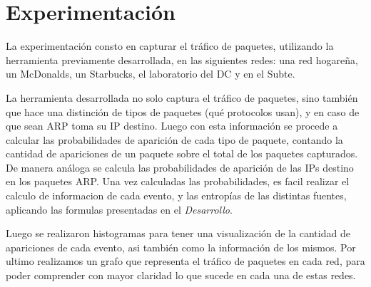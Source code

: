 \section{Experimentación}
La experimentación consto en capturar el tráfico de paquetes, utilizando la herramienta previamente desarrollada, en las siguientes redes: una red hogareña, un McDonalds, un Starbucks, el laboratorio del DC y en el Subte.

La herramienta desarrollada no solo captura el tráfico de paquetes, sino también que hace una distinción de tipos de paquetes (qué protocolos usan), y en caso de que sean ARP toma su IP destino. Luego con esta información se procede a calcular las probabilidades de aparición de cada tipo de paquete, contando la cantidad de apariciones de un paquete sobre el total de los paquetes capturados. De manera análoga se calcula las probabilidades de aparición de las IPs destino en los paquetes ARP. Una vez calculadas las probabilidades, es facil realizar el calculo de informacion de cada evento, y las entropías de las distintas fuentes, aplicando las formulas presentadas en el \textit{Desarrollo}.

Luego se realizaron histogramas para tener una visualización de la cantidad de apariciones de cada evento, asi también como la información de los mismos.
Por ultimo realizamos un grafo que representa el tráfico de paquetes en cada red, para poder comprender con mayor claridad lo que sucede en cada una de estas redes.
\newpage


\newpage


\newpage


\newpage


\newpage


\newpage



